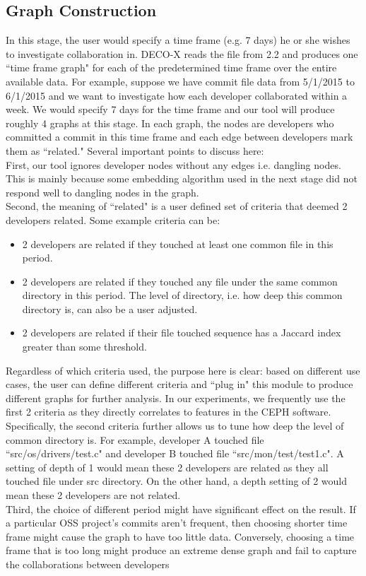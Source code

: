 \documentclass{article}
\begin{document}
\subsection{Graph Construction}
In this stage, the user would specify a time frame (e.g. 7 days) he or she wishes to investigate collaboration in. DECO-X reads the file from 2.2 and produces one ``time frame graph" for each of the predetermined time frame over the entire available data. For example, suppose we have commit file data from 5/1/2015 to 6/1/2015 and we want to investigate how each developer collaborated within a week. We would specify 7 days for the time frame and our tool will produce roughly 4 graphs at this stage. In each graph, the nodes are developers who committed a commit in this time frame and each edge between developers mark them as ``related." Several important points to discuss here:\\
First, our tool ignores developer nodes without any edges i.e. dangling nodes. This is mainly because some embedding algorithm used in the next stage did not respond well to dangling nodes in the graph.\\
Second, the meaning of ``related" is a user defined set of criteria that deemed 2 developers related. Some example criteria can be:
\begin{itemize}
    \item 2 developers are related if they touched at least one common file in this period.
    \item 2 developers are related if they touched any file under the same common directory in this period. The level of directory, i.e. how deep this common directory is, can also be a user adjusted.
    \item 2 developers are related if their file touched sequence has a Jaccard index greater than some threshold.
\end{itemize}
Regardless of which criteria used, the purpose here is clear: based on different use cases, the user can define different criteria and ``plug in" this module to produce different graphs for further analysis. In our experiments, we frequently use the first 2 criteria as they directly correlates to features in the CEPH software. Specifically, the second criteria further allows us to tune how deep the level of common directory is. For example, developer A touched file ``src/os/drivers/test.c" and developer B touched file ``src/mon/test/test1.c". A setting of depth of 1 would mean these 2 developers are related as they all touched file under src directory. On the other hand, a depth setting of 2 would mean these 2 developers are not related.\\
Third, the choice of different period might have significant effect on the result. If a particular OSS project's commits aren't frequent, then choosing shorter time frame might cause the graph to have too little data. Conversely, choosing a time frame that is too long might produce an extreme dense graph and fail to capture the collaborations between developers
\end{document}
